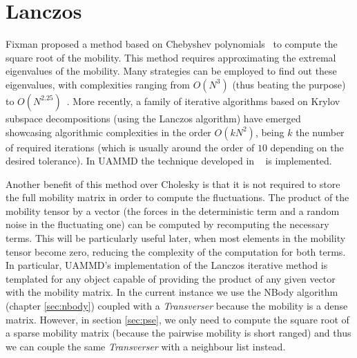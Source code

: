 \documentclass[ twoside,openright,titlepage,numbers=noenddot,%
headinclude,footinclude,cleardoublepage=empty,abstract=on,
BCOR=5mm,paper=b5,fontsize=11pt, dvipsnames
]{scrreprt}
\newcommand{\uammd}{\gls{UAMMD}\xspace}
\begin{document}
\section{Lanczos}\label{sec:lanczos}
Fixman proposed a method based on Chebyshev polynomials~\cite{Fixman1986} to compute the square root of the mobility. This method requires approximating the extremal eigenvalues of the mobility. Many strategies can be employed to find out these eigenvalues, with complexities ranging from $O(N^3)$ (thus beating the purpose) to $O(N^{2.25})$~\cite{Jendrejack2000}. More recently, a family of iterative algorithms based on Krylov subspace decompositions (using the Lanczos algorithm) have emerged~\cite{Ando2012,Saadat2014} showcasing algorithmic complexities in the order $O(kN^2)$, being $k$ the number of required iterations (which is usually around the order of $10$ depending on the desired tolerance). In \uammd the technique developed in ~\cite{Ando2012} is implemented.

Another benefit of this method over Cholesky is that it is not required to store the full mobility matrix in order to compute the fluctuations. The product of the mobility tensor by a vector (the forces in the deterministic term and a random noise in the fluctuating one) can be computed by recomputing the necessary terms. This will be particularly useful later, when most elements in the mobility tensor become zero, reducing the complexity of the computation for both terms. In particular, \uammd's implementation of the Lanczos iterative method is templated for any object capable of providing the product of any given vector with the mobility matrix. In the current instance we use the NBody algorithm (chapter \ref{sec:nbody}) coupled with a \emph{Transverser} because the mobility is a dense matrix. However, in section \ref{sec:pse}, we only need to compute the square root of a sparse mobility matrix (because the pairwise mobility is short ranged) and thus we can couple the same \emph{Transverser} with a neighbour list instead.


\end{document}
